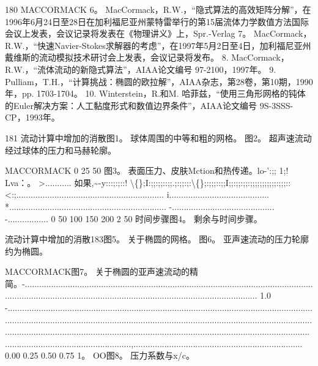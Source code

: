\documentclass[UTF8,11pt,a4paper,openany,fontset=fandol]{ctexbook}
\begin{document}
180 MACCORMACK 6。 MacCormack，R.W.，“隐式算法的高效矩阵分解”，在1996年6月24日至28日在加利福尼亚州蒙特雷举行的第15届流体力学数值方法国际会议上发表，会议记录将发表在《物理讲义》上，Spr.-Verlag 7。 MacCormack，R.W.，“快速Navier-Stokes求解器的考虑”，在1997年5月2日至4日，加利福尼亚州戴维斯的流动模拟技术研讨会上发表，会议记录将发布。 8. MacCormack，R.W.，“流体流动的新隐式算法”，AIAA论文编号 97-2100，1997年。 9. Pulliam，T.H.，“计算挑战：椭圆的欧拉解”，AIAA杂志，第28卷，第10期，1990年，pp. 1703-1704。 10. Winterstein，R.和M. 哈菲兹，“使用三角形网格的钝体的Euler解决方案：人工黏度形式和数值边界条件”，AIAA论文编号 9S-3SSS-CP，1993年。

181 流动计算中增加的消散图1。 球体周围的中等和粗的网格。 图2。 超声速流动经过球体的压力和马赫轮廓。

MACCORMACK 0 25 50 图3。 表面压力、皮肤Mction和热传递。lo-':;; 1;! Lva：。 >........... 如果,\textasciitilde{}-y:::;:;::! \textbackslash\{\};I:;;:;;::;;.;:;;:;:\textbackslash\{\};:;;;::;;I;;:;;:;;:;;;;;;;;;;;:;;;:: <:;.............................................................. i.......................................... *.................................................................. -........................................... -................. 0 50 100 150 200 2 50 时间步骤图4。 剩余与时间步骤。

流动计算中增加的消散183图5。 关于椭圆的网格。 图6。 亚声速流动的压力轮廓约为椭圆。

MACCORMACK图7。 关于椭圆的亚声速流动的精简。-................................................................................................................................................................................................................................... 1.0 -................................................................................................................................................................................................................................................................................................................................................................................................. .....................................................,....................................................................... 0.00 0.25 0.50 0.75 1。 OO图8。 压力系数与x/c。

\clearpage
\end{document}
